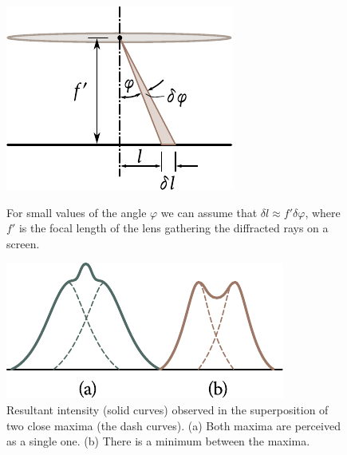 \begin{figure}[t]
	\begin{minipage}[t]{0.48\linewidth}
		\begin{center}
			\includegraphics[scale=0.95]{figures/ch_18/fig_18_36.pdf}
            \caption[]{For small values of the angle $\varphi$ we can assume that $\delta{l}\approx f'\delta{\varphi}$, where $f'$ is the focal length of the lens gathering the diffracted rays on a screen.}
			\label{fig:18_36}
		\end{center}
	\end{minipage}
	\hfill{ }%
	\begin{minipage}[t]{0.48\linewidth}
		\begin{center}
			\includegraphics[scale=0.95]{figures/ch_18/fig_18_37.pdf}
			\caption[]{Resultant intensity (solid curves) observed in the superposition of two close maxima (the dash curves).
			(a) Both maxima are perceived as a single one. (b) There is a minimum between the maxima.}
			\label{fig:18_37}
		\end{center}
	\end{minipage}
\vspace{-0.4cm}
\end{figure}

